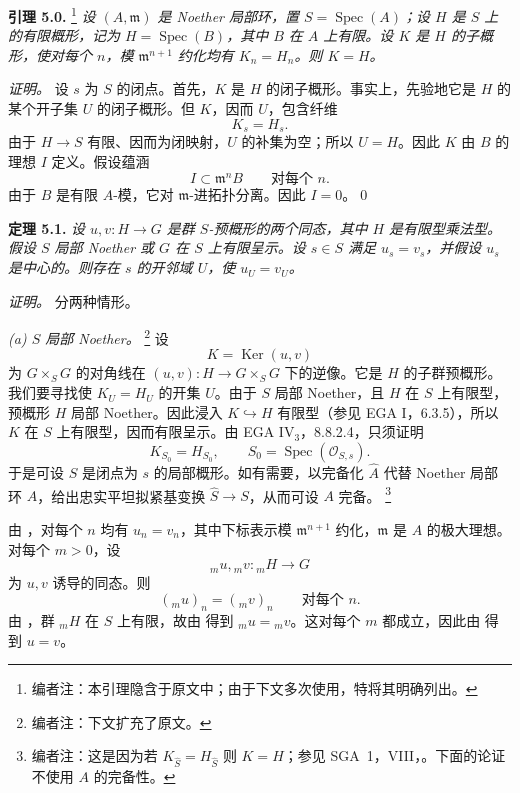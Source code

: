 \medskip
\noindent{}\textbf{引理 5.0.}%
\footnote{编者注：本引理隐含于原文中；由于下文多次使用，特将其明确列出。}
\textit{设 \((A,\mathfrak m)\) 是 Noether 局部环，置 \(S=\operatorname{Spec}(A)\)；设 \(H\) 是 \(S\) 上的有限概形，记为 \(H=\operatorname{Spec}(B)\)，其中 \(B\) 在 \(A\) 上有限。设 \(K\) 是 \(H\) 的子概形，使对每个 \(n\)，模 \(\mathfrak m^{n+1}\) 约化均有 \(K_n=H_n\)。则 \(K=H\)。}

\emph{证明。}
设 \(s\) 为 \(S\) 的闭点。首先，\(K\) 是 \(H\) 的闭子概形。事实上，先验地它是 \(H\) 的某个开子集 \(U\) 的闭子概形。但 \(K\)，因而 \(U\)，包含纤维
\[
  K_s=H_s.
\]
由于 \(H\to S\) 有限、因而为闭映射，\(U\) 的补集为空；所以 \(U=H\)。因此 \(K\) 由 \(B\) 的理想 \(I\) 定义。假设蕴涵
\[
  I\subset\mathfrak m^nB
  \qquad\text{对每个 }n.
\]
由于 \(B\) 是有限 \(A\)-模，它对 \(\mathfrak m\)-进拓扑分离。因此 \(I=0\)。\qed

\medskip
\noindent{}\textbf{定理 5.1.}
\textit{设 \(u,v:H\to G\) 是群 \(S\)-预概形的两个同态，其中 \(H\) 是有限型乘法型。假设 \(S\) 局部 Noether 或 \(G\) 在 \(S\) 上有限呈示。设 \(s\in S\) 满足 \(u_s=v_s\)，并假设 \(u_s\) 是中心的。则存在 \(s\) 的开邻域 \(U\)，使 \(u_U=v_U\)。}

\emph{证明。}
分两种情形。

\smallskip
{}\noindent\textit{(a) \(S\) 局部 Noether。}%
\footnote{编者注：下文扩充了原文。}
设
\[
  K=\operatorname{Ker}(u,v)
\]
为 \(G\times_SG\) 的对角线在 \((u,v):H\to G\times_SG\) 下的逆像。它是 \(H\) 的子群预概形。我们要寻找使 \(K_U=H_U\) 的开集 \(U\)。由于 \(S\) 局部 Noether，且 \(H\) 在 \(S\) 上有限型，预概形 \(H\) 局部 Noether。因此浸入 \(K\hookrightarrow H\) 有限型（参见 EGA I，6.3.5），所以 \(K\) 在 \(S\) 上有限型，因而有限呈示。由 EGA IV\(_3\)，8.8.2.4，只须证明
\[
  K_{S_0}=H_{S_0},
  \qquad
  S_0=\operatorname{Spec}(\mathscr O_{S,s}).
\]
于是可设 \(S\) 是闭点为 \(s\) 的局部概形。如有需要，以完备化 \(\widehat A\) 代替 Noether 局部环 \(A\)，给出忠实平坦拟紧基变换 \(\widehat S\to S\)，从而可设 \(A\) 完备。%
\footnote{编者注：这是因为若 \(K_{\widehat S}=H_{\widehat S}\) 则 \(K=H\)；参见 SGA~1，VIII，。下面的论证不使用 \(A\) 的完备性。}

由 ，对每个 \(n\) 均有 \(u_n=v_n\)，其中下标表示模 \(\mathfrak m^{n+1}\) 约化，\(\mathfrak m\) 是 \(A\) 的极大理想。对每个 \(m>0\)，设
\[
  {}_mu,{}_mv:{}_mH\longrightarrow G
\]
为 \(u,v\) 诱导的同态。则
\[
  ({}_mu)_n=({}_mv)_n
  \qquad\text{对每个 }n.
\]
由 ，群 \({}_mH\) 在 \(S\) 上有限，故由  得到 \({}_mu={}_mv\)。这对每个 \(m\) 都成立，因此由  得到 \(u=v\)。


